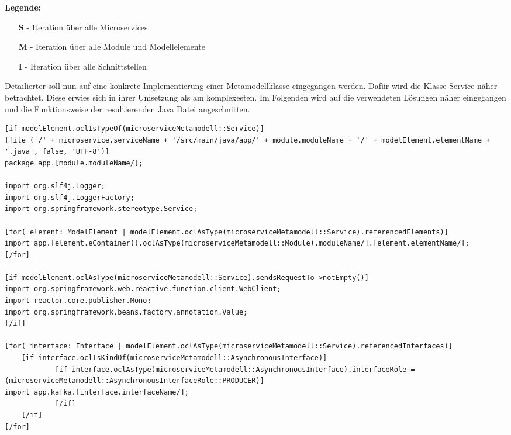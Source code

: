 \textbf{Legende:}
\begin{itemize}
    \item[\textbf{S}] - Iteration über alle Microservices
    \item[\textbf{M}] - Iteration über alle Module und Modellelemente
    \item[\textbf{I}] - Iteration über alle Schnittstellen
\end{itemize}

\newpage

Detailierter soll nun auf eine konkrete Implementierung einer Metamodellklasse eingegangen werden. Dafür wird die Klasse Service näher betrachtet. Diese erwies sich in ihrer Umsetzung als am komplexesten. Im Folgenden wird auf die verwendeten Lösungen näher eingegangen und die Funktionsweise der resultierenden Java Datei angeschnitten.

\begin{lstlisting}[caption=Importieren anderer Klassen]
[if modelElement.oclIsTypeOf(microserviceMetamodell::Service)]
[file ('/' + microservice.serviceName + '/src/main/java/app/' + module.moduleName + '/' + modelElement.elementName + '.java', false, 'UTF-8')] 
package app.[module.moduleName/];

import org.slf4j.Logger;
import org.slf4j.LoggerFactory;
import org.springframework.stereotype.Service;

[for( element: ModelElement | modelElement.oclAsType(microserviceMetamodell::Service).referencedElements)]
import app.[element.eContainer().oclAsType(microserviceMetamodell::Module).moduleName/].[element.elementName/];
[/for]

[if modelElement.oclAsType(microserviceMetamodell::Service).sendsRequestTo->notEmpty()]
import org.springframework.web.reactive.function.client.WebClient;
import reactor.core.publisher.Mono;
import org.springframework.beans.factory.annotation.Value;
[/if]

[for( interface: Interface | modelElement.oclAsType(microserviceMetamodell::Service).referencedInterfaces)]
	[if interface.oclIsKindOf(microserviceMetamodell::AsynchronousInterface)]
			[if interface.oclAsType(microserviceMetamodell::AsynchronousInterface).interfaceRole = (microserviceMetamodell::AsynchronousInterfaceRole::PRODUCER)]
import app.kafka.[interface.interfaceName/];
			[/if]
	[/if]
[/for]
\end{lstlisting}

